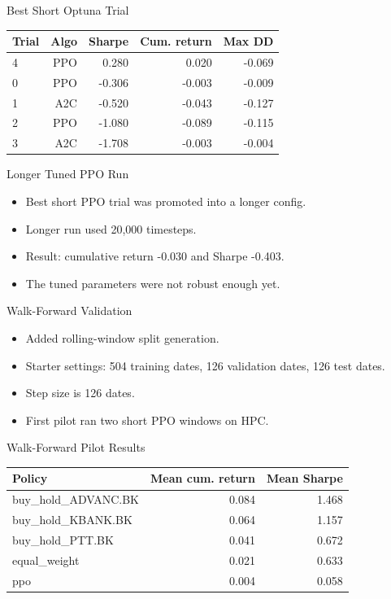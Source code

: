 \documentclass[aspectratio=43,10pt]{beamer}
\begin{document}
\begin{frame}{Best Short Optuna Trial}
\begin{center}
\begin{tabular}{lrrrr}
\toprule
Trial & Algo & Sharpe & Cum. return & Max DD \\
\midrule
4 & PPO & 0.280 & 0.020 & -0.069 \\
0 & PPO & -0.306 & -0.003 & -0.009 \\
1 & A2C & -0.520 & -0.043 & -0.127 \\
2 & PPO & -1.080 & -0.089 & -0.115 \\
3 & A2C & -1.708 & -0.003 & -0.004 \\
\bottomrule
\end{tabular}
\end{center}
\end{frame}

\begin{frame}{Longer Tuned PPO Run}
\begin{itemize}
  \item Best short PPO trial was promoted into a longer config.
  \item Longer run used 20,000 timesteps.
  \item Result: cumulative return -0.030 and Sharpe -0.403.
  \item The tuned parameters were not robust enough yet.
\end{itemize}
\end{frame}

\begin{frame}{Walk-Forward Validation}
\begin{itemize}
  \item Added rolling-window split generation.
  \item Starter settings: 504 training dates, 126 validation dates, 126 test dates.
  \item Step size is 126 dates.
  \item First pilot ran two short PPO windows on HPC.
\end{itemize}
\end{frame}

\begin{frame}{Walk-Forward Pilot Results}
\begin{center}
\begin{tabular}{lrr}
\toprule
Policy & Mean cum. return & Mean Sharpe \\
\midrule
buy\_hold\_ADVANC.BK & 0.084 & 1.468 \\
buy\_hold\_KBANK.BK & 0.064 & 1.157 \\
buy\_hold\_PTT.BK & 0.041 & 0.672 \\
equal\_weight & 0.021 & 0.633 \\
ppo & 0.004 & 0.058 \\
\bottomrule
\end{tabular}
\end{center}
\end{frame}
\end{document}
